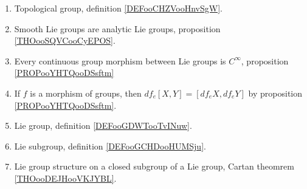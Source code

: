 	\label{THEMEooLieGroups}
\begin{enumerate}
	\item
	      Topological group, definition \ref{DEFooCHZVooHnvSgW}.
	\item
	      Smooth Lie groups are analytic Lie groups, proposition \ref{THOooSQVCooCyEPOS}.
	\item
	      Every continuous group morphism between Lie groups is \( C^{\infty}\), proposition \ref{PROPooYHTQooDSsftm}
	\item
	      If \( f\) is a morphism of groups, then \( df_e[X,Y]=[df_eX,df_eY]\) by proposition \ref{PROPooYHTQooDSsftm}.
	\item
	      Lie group, definition \ref{DEFooGDWTooTvINuw}.
	\item
	      Lie subgroup, definition \ref{DEFooGCHDooHUMSju}.
	\item
	      Lie group structure on a closed subgroup of a Lie group, Cartan theomrem \ref{THOooDEJHooVKJYBL}.
\end{enumerate}
